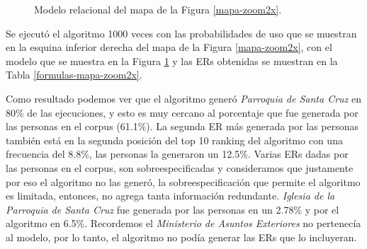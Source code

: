 \begin{figure}[h]
\caption{Modelo relacional del mapa de la Figura \ref{mapa-zoom2x}.}
\label{modelo-mapa-zoom2x}
\end{figure}


Se ejecut\'o el algoritmo 1000 veces con las probabilidades de uso que se muestran en la esquina inferior derecha del mapa de la Figura \ref{mapa-zoom2x}, con el modelo que se muestra en la Figura \ref{modelo-mapa-zoom2x} y las ERs obtenidas se muestran en la Tabla \ref{formulas-mapa-zoom2x}.


Como resultado podemos ver que el algoritmo gener\'o {\it Parroquia de Santa Cruz} en 80\% de las ejecuciones, y esto es muy cercano al porcentaje que fue generada por las personas en el corpus (61.1\%). La segunda ER m\'as generada por las personas tambi\'en est\'a en la segunda posici\'on del top 10 ranking del algoritmo con una frecuencia del 8.8\%, las personas la generaron un 12.5\%. Varias ERs dadas por las personas en el corpus, son sobreespecificadas y consideramos que justamente por eso el algoritmo no las gener\'o, la sobreespecificaci\'on que permite el algoritmo es limitada, entonces, no agrega tanta informaci\'on redundante. {\it Iglesia de la Parroquia de Santa Cruz} fue generada por las personas en un 2.78\% y por el algoritmo en 6.5\%. Recordemos el {\it Ministerio de Asuntos Exteriores} no pertenec\'ia al modelo, por lo tanto, el algoritmo no pod\'ia generar las ERs que lo incluyeran.%


